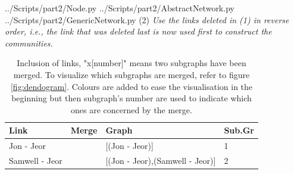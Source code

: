 \documentclass[10pt,a4paper]{article}
\begin{document}
\begin{enumerate}
	 {../Scripts/part2/Node.py}
	 {../Scripts/part2/AbstractNetwork.py}
	 {../Scripts/part2/GenericNetwork.py}
	\newpage
	(2) \textit{Use the links deleted in (1) in reverse order, i.e., the link that was deleted last is now
		used first to construct the communities.}
	
	



\begin{table}[H]
	\centering
	\caption{Inclusion of links, "x[number]" means two subgraphs have been merged. To visualize which subgraphs are merged, refer to figure \ref{fig:dendogram}. Colours are added to ease the visualisation in the beginning but then subgraph's number are used to indicate which ones are concerned by the merge.}
	\label{tabitab}
	\begin{tabular}{|l|l|l|l|}
		\hline
		Link              & Merge & Graph   & Sub.Gr                                                                                                                                                                                                                                                                                                                                                                                                                                                                                             \\ \hline
		Jon - Jeor        &       & {[}(Jon - Jeor){]}  & 1                                                                                                                                                                                                                                                                                                                                                                                                                                                                                 \\ \hline
		Samwell - Jeor    &       & {[}(Jon - Jeor),(Samwell - Jeor){]}  & 2                                                                                                                                                                                                                                                                                                                                                                                                                                                               \\ \hline

\end{tabular}
\end{table}
\end{enumerate}
\end{document}
